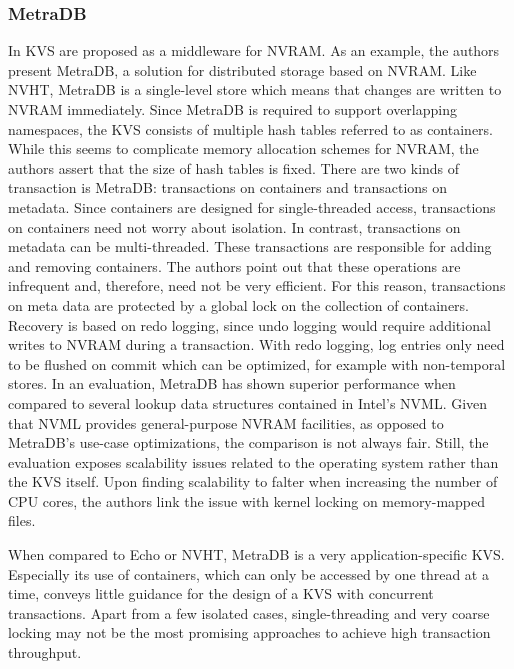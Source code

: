\subsubsection{MetraDB}

In \cite{marmol2016nonvolatile} \ac{KVS} are proposed as a middleware for
\ac{NVRAM}. As an example, the authors present MetraDB, a solution for
distributed storage based on \ac{NVRAM}. Like NVHT, MetraDB is a single-level
store which means that changes are written to \ac{NVRAM} immediately. Since
MetraDB is required to support overlapping namespaces, the \ac{KVS} consists of
multiple hash tables referred to as containers. While this seems to complicate
memory allocation schemes for \ac{NVRAM}, the authors assert that the size of
hash tables is fixed. There are two kinds of transaction is MetraDB:
transactions on containers and transactions on metadata. Since containers are
designed for single-threaded access, transactions on containers need not worry
about isolation. In contrast, transactions on metadata can be multi-threaded.
These transactions are responsible for adding and removing containers. The
authors point out that these operations are infrequent and, therefore, need not
be very efficient. For this reason, transactions on meta data are protected by a
global lock on the collection of containers. Recovery is based on redo logging,
since undo logging would require additional writes to \ac{NVRAM} during a
transaction. With redo logging, log entries only need to be flushed on commit
which can be optimized, for example with non-temporal stores. In an evaluation,
MetraDB has shown superior performance when compared to several lookup data
structures contained in Intel's NVML. Given that NVML provides general-purpose
\ac{NVRAM} facilities, as opposed to MetraDB's use-case optimizations, the
comparison is not always fair. Still, the evaluation exposes scalability issues
related to the operating system rather than the \ac{KVS} itself. Upon finding
scalability to falter when increasing the number of \ac{CPU} cores, the authors
link the issue with kernel locking on memory-mapped files.

When compared to Echo or NVHT, MetraDB is a very application-specific \ac{KVS}.
Especially its use of containers, which can only be accessed by one thread at a
time, conveys little guidance for the design of a \ac{KVS} with concurrent
transactions. Apart from a few isolated cases, single-threading and very coarse
locking may not be the most promising approaches to achieve high transaction
throughput.
